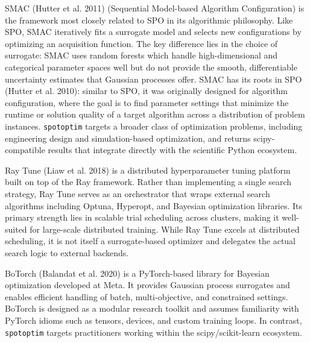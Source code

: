 \documentclass[
  twocolumn]{article}
\begin{document}
SMAC (Hutter et al. 2011) (Sequential Model-based Algorithm
Configuration) is the framework most closely related to SPO in its
algorithmic philosophy. Like SPO, SMAC iteratively fits a surrogate
model and selects new configurations by optimizing an acquisition
function. The key difference lies in the choice of surrogate: SMAC uses
random forests which handle high-dimensional and categorical parameter
spaces well but do not provide the smooth, differentiable uncertainty
estimates that Gaussian processes offer. SMAC has its roots in SPO
(Hutter et al. 2010): similar to SPO, it was originally designed for
algorithm configuration, where the goal is to find parameter settings
that minimize the runtime or solution quality of a target algorithm
across a distribution of problem instances. \texttt{spotoptim} targets a
broader class of optimization problems, including engineering design and
simulation-based optimization, and returns scipy-compatible results that
integrate directly with the scientific Python ecosystem.

Ray Tune (Liaw et al. 2018) is a distributed hyperparameter tuning
platform built on top of the Ray framework. Rather than implementing a
single search strategy, Ray Tune serves as an orchestrator that wraps
external search algorithms including Optuna, Hyperopt, and Bayesian
optimization libraries. Its primary strength lies in scalable trial
scheduling across clusters, making it well-suited for large-scale
distributed training. While Ray Tune excels at distributed scheduling,
it is not itself a surrogate-based optimizer and delegates the actual
search logic to external backends.

BoTorch (Balandat et al. 2020) is a PyTorch-based library for Bayesian
optimization developed at Meta. It provides Gaussian process surrogates
and enables efficient handling of batch, multi-objective, and
constrained settings. BoTorch is designed as a modular research toolkit
and assumes familiarity with PyTorch idioms such as tensors, devices,
and custom training loops. In contrast, \texttt{spotoptim} targets
practitioners working within the scipy/scikit-learn ecosystem.
\end{document}
